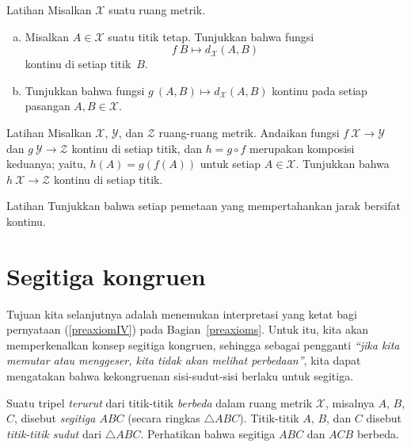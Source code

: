 \begin{thm}[!]{Latihan}\label{ex:dist-cont}
Misalkan $\mathcal{X}$ suatu ruang metrik.
\begin{enumerate}[(a)]
\item\label{ex:dist-cont:a} Misalkan $A\in \mathcal{X}$ suatu titik tetap.
Tunjukkan bahwa fungsi 
$$f\:B\mapsto
d_{\mathcal{X}}(A,B)$$ 
kontinu di setiap titik~$B$.
\item Tunjukkan bahwa fungsi $g\:(A,B)\mapsto d_{\mathcal{X}}(A,B)$ kontinu pada setiap pasangan $A,B\in \mathcal{X}$.
\end{enumerate}

\end{thm}

\begin{thm}[!]{Latihan}\label{ex:comp+cont}
Misalkan $\mathcal{X}$, $\mathcal{Y}$, dan $\mathcal{Z}$ ruang-ruang metrik.
Andaikan fungsi $f\:\mathcal{X}\to\mathcal{Y}$
dan $g\:\mathcal{Y}\to\mathcal{Z}$ kontinu di setiap titik,
dan $h=g\circ f$ merupakan komposisi keduanya;
yaitu, $h(A)=g(f(A))$ untuk setiap $A\in \mathcal{X}$.
Tunjukkan bahwa $h\:\mathcal{X}\to\mathcal{Z}$ kontinu di setiap titik.
\end{thm}

\begin{thm}{Latihan}\label{ex:isom-cont}
Tunjukkan bahwa setiap pemetaan yang mempertahankan jarak bersifat kontinu.
\end{thm}

\section{Segitiga kongruen}
\label{sec:cong-triangles}

Tujuan kita selanjutnya adalah menemukan interpretasi yang ketat bagi pernyataan (\ref{preaxiomIV}) pada Bagian~\ref{preaxioms}.
Untuk itu, kita akan memperkenalkan konsep segitiga kongruen,
sehingga sebagai pengganti \textit{``jika kita memutar atau menggeser, kita tidak akan melihat perbedaan''}, kita dapat mengatakan bahwa kekongruenan sisi-sudut-sisi berlaku untuk segitiga.

Suatu tripel \textit{terurut} dari titik-titik \textit{berbeda} dalam ruang metrik $\mathcal{X}$, 
misalnya $A$, $B$, $C$,
disebut \emph{segitiga $ABC$}\label{page:def:triangle} (secara ringkas $\triangle A B C$).
Titik-titik $A$, $B$, dan $C$ disebut \emph{titik-titik sudut} dari $\triangle ABC$.
Perhatikan bahwa segitiga $A B C$ dan $A C B$ berbeda.

